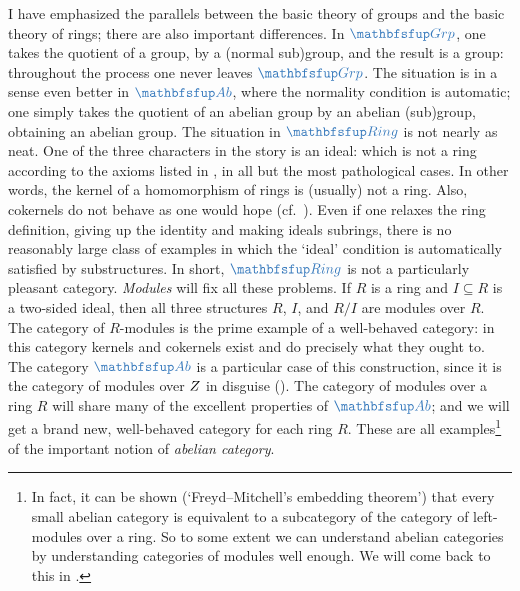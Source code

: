 I have emphasized the parallels between the basic theory of groups and
the basic theory of rings; there are also important differences. In
$\categ{Grp}$, one takes the quotient of a group, by a (normal
sub)group, and the result is a group: throughout the process one never
leaves $\categ{Grp}$. The situation is in a sense even better in
$\categ{Ab}$, where the normality condition is automatic; one simply
takes the quotient of an abelian group by an abelian (sub)group,
obtaining an abelian group.  The situation in $\categ{Ring}$ is not
nearly as neat. One of the three characters in the story is an ideal:
which is not a ring according to the axioms listed in
, in all but the most pathological cases. In
other words, the kernel of a homomorphism of rings is (usually) not a
ring. Also, cokernels do not behave as one would hope (cf.\
). Even if one relaxes the ring
definition, giving up the identity and making ideals subrings, there
is no reasonably large class of examples in which the `ideal'
condition is automatically satisfied by substructures. In short,
$\categ{Ring}$ is not a particularly pleasant category.
\emph{Modules} will fix all these problems. If $R$ is a ring and
$I \subseteq R$ is a two-sided ideal, then all three structures $R$,
$I$, and $R/I$ are modules over $R$. The category of $R$-modules is
the prime example of a well-behaved category: in this category kernels
and cokernels exist and do precisely what they ought to. The category
$\categ{Ab}$ is a particular case of this construction, since it is
the category of modules over $Z$ in disguise
(). The category of modules over a ring
$R$ will share many of the excellent properties of $\categ{Ab}$; and
we will get a brand new, well-behaved category for each ring
$R$. These are all examples\footnote{In fact, it can be shown
  (`Freyd--Mitchell's embedding theorem') that every small abelian
  category is equivalent to a subcategory of the category of
  left-modules over a ring. So to some extent we can understand
  abelian categories by understanding categories of modules well
  enough. We will come back to this in \Cref{chap:homol}.} of the
important notion of \emph{abelian category}.

